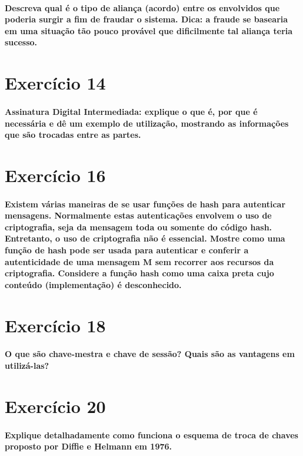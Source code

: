 \documentclass[10pt,a4paper]{report}
\begin{document}
\paragraph{Descreva qual é o tipo de aliança (acordo) entre os envolvidos que poderia surgir a fim de fraudar o sistema. Dica: a fraude se basearia em uma situação tão pouco provável que dificilmente tal aliança teria sucesso.}

\section*{Exercício 14}
\paragraph{Assinatura Digital Intermediada: explique o que é, por que é necessária e dê um exemplo de utilização, mostrando as informações que são trocadas entre as partes.}

\section*{Exercício 16}
\paragraph{Existem várias maneiras de se usar funções de hash para autenticar mensagens. Normalmente estas autenticações envolvem o uso de criptografia, seja da mensagem toda ou somente do código hash. Entretanto, o uso de criptografia não é essencial. Mostre como uma função de hash pode ser usada para autenticar e conferir a autenticidade de uma mensagem M sem recorrer aos recursos da criptografia. Considere a função hash como uma caixa preta cujo conteúdo (implementação) é desconhecido.}

\section*{Exercício 18}
\paragraph{O que são chave-mestra e chave de sessão? Quais são as vantagens em utilizá-las?}

\section*{Exercício 20}
\paragraph{Explique detalhadamente como funciona o esquema de troca de chaves proposto por Diffie e Helmann em 1976.}
\end{document}
